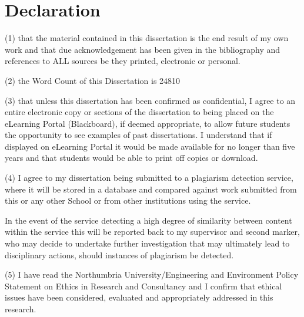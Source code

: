 \chapter{Declaration}
(1) that the material contained in this dissertation is the end result of my own work and that due acknowledgement has been given in the bibliography and references to ALL sources be they printed, electronic or personal.

(2) the Word Count of this Dissertation is 24810

(3) that unless this dissertation has been confirmed as confidential, I agree to an entire electronic copy or sections of the dissertation to being placed on the eLearning Portal (Blackboard), if deemed appropriate, to allow future students the opportunity to see examples of past dissertations. I understand that if displayed on eLearning Portal it would be made available for no longer than five years and that students would be able to print off copies or download.  

(4) I agree to my dissertation being submitted to a plagiarism detection service, where it will be stored in a database and compared against work submitted from this or any other School or from other institutions using the service.  

In the event of the service detecting a high degree of similarity between content within the service this will be reported back to my supervisor and second marker, who may decide to undertake further investigation that may ultimately lead to disciplinary actions, should instances of plagiarism be detected.

(5) I have read the Northumbria University/Engineering and Environment Policy Statement on Ethics in Research and Consultancy and I confirm that ethical issues have been considered, evaluated and appropriately addressed in this research.
 

